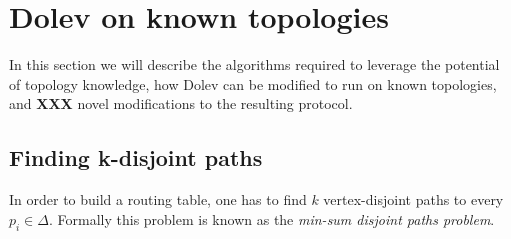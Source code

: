




\section{Dolev on known topologies}
\label{contr-dolev}
In this section we will describe the algorithms required to leverage the potential of topology knowledge, how Dolev can be modified to run on known topologies, and \textbf{XXX} novel modifications to the resulting protocol.

\subsection{Finding k-disjoint paths}
In order to build a routing table, one has to find $k$ vertex-disjoint paths to every $p_i \in \Delta$. Formally this problem is known as the \textit{min-sum disjoint paths problem}.

